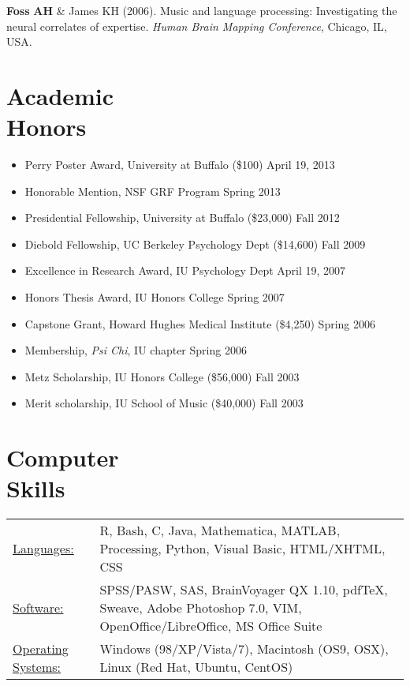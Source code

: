 \documentclass[margin]{res}
\begin{document}
\begin{resume}
\begin{tabbing}
{\bf Foss}  {\bf AH} \& James KH (2006). Music and language 
 processing: Investigating the\\
 \> neural correlates of expertise. {\it Human Brain Mapping 
 Conference}, Chicago, IL,\\
 \> USA.

\end{tabbing}


\section{Academic \\ Honors} 
\begin{itemize} \itemsep -2pt
 \item Perry Poster Award, University at Buffalo (\$100) \hfill April 19, 2013
 \item Honorable Mention, NSF GRF Program \hfill Spring 2013
 \item Presidential Fellowship, University at Buffalo (\$23,000) \hfill Fall 2012
 \item Diebold Fellowship, UC Berkeley Psychology Dept (\$14,600) \hfill Fall 2009
 \item Excellence in Research Award, IU Psychology Dept \hfill April 19, 2007
 \item Honors Thesis Award, IU Honors College \hfill Spring 2007
 \item Capstone Grant, Howard Hughes Medical Institute (\$4,250) \hfill Spring 2006
 \item Membership, {\it Psi Chi}, IU chapter \hfill Spring 2006
 \item Metz Scholarship, IU Honors College (\$56,000) \hfill Fall 2003
 \item Merit scholarship, IU School of Music (\$40,000) \hfill Fall 2003
\end{itemize}
 

\section{Computer \\ Skills}
   \begin{tabular}{l p{3in}}
   \rule{0cm}{.5cm}
    \underline{Languages:} & R, Bash, C, Java, Mathematica, MATLAB, 
                             Processing, Python, Visual Basic, HTML/XHTML,
                             CSS\\
   \rule{0cm}{.5cm}
    \underline{Software:} & SPSS/PASW, SAS, BrainVoyager QX 1.10, pdf\TeX{}, 
                            Sweave, Adobe Photoshop 7.0, VIM, 
                            OpenOffice/LibreOffice, MS Office Suite\\
   \rule{0cm}{.5cm}
    \underline{Operating Systems:} & Windows (98/XP/Vista/7),
                                     Macintosh (OS9, OSX),
                                     Linux (Red Hat, Ubuntu, CentOS)
   \end{tabular}



\end{resume}
\end{document}
